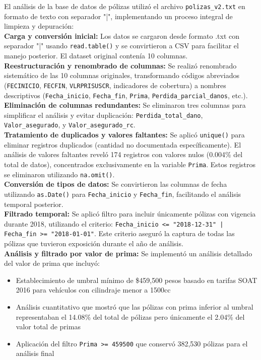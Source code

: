 El análisis de la base de datos de pólizas utilizó el archivo \texttt{polizas\_v2.txt} en formato de texto con separador "|", implementando un proceso integral de limpieza y depuración:\\

\textbf{Carga y conversión inicial:} Los datos se cargaron desde formato .txt con separador "|" usando \texttt{read.table()} y se convirtieron a CSV para facilitar el manejo posterior. El dataset original contenía 10 columnas.\\

\textbf{Reestructuración y renombrado de columnas:} Se realizó renombrado sistemático de las 10 columnas originales, transformando códigos abreviados (\texttt{FECINICIO}, \texttt{FECFIN}, \texttt{VLRPRISUSCR}, indicadores de cobertura) a nombres descriptivos (\texttt{Fecha\_inicio}, \texttt{Fecha\_fin}, \texttt{Prima}, \texttt{Perdida\_parcial\_danos}, etc.).\\

\textbf{Eliminación de columnas redundantes:} Se eliminaron tres columnas para simplificar el análisis y evitar duplicación: \texttt{Perdida\_total\_dano}, \texttt{Valor\_asegurado}, y \texttt{Valor\_asegurado\_rc}.\\

\textbf{Tratamiento de duplicados y valores faltantes:} Se aplicó \texttt{unique()} para eliminar registros duplicados (cantidad no documentada específicamente). El análisis de valores faltantes reveló 174 registros con valores nulos (0.004\% del total de datos), concentrados exclusivamente en la variable \texttt{Prima}. Estos registros se eliminaron utilizando \texttt{na.omit()}.\\

\textbf{Conversión de tipos de datos:} Se convirtieron las columnas de fecha utilizando \texttt{as.Date()} para \texttt{Fecha\_inicio} y \texttt{Fecha\_fin}, facilitando el análisis temporal posterior.\\

\textbf{Filtrado temporal:} Se aplicó filtro para incluir únicamente pólizas con vigencia durante 2018, utilizando el criterio: \texttt{Fecha\_inicio <= "2018-12-31" | Fecha\_fin >= "2018-01-01"}. Este criterio aseguró la captura de todas las pólizas que tuvieron exposición durante el año de análisis.\\

\textbf{Análisis y filtrado por valor de prima:} Se implementó un análisis detallado del valor de prima que incluyó:
\begin{itemize}
    \item Establecimiento de umbral mínimo de \$459,500 pesos basado en tarifas SOAT 2016 para vehículos con cilindraje menor a 1500cc
    \item Análisis cuantitativo que mostró que las pólizas con prima inferior al umbral representaban el 14.08\% del total de pólizas pero únicamente el 2.04\% del valor total de primas
    \item Aplicación del filtro \texttt{Prima >= 459500} que conservó 382,530 pólizas para el análisis final
\end{itemize}

